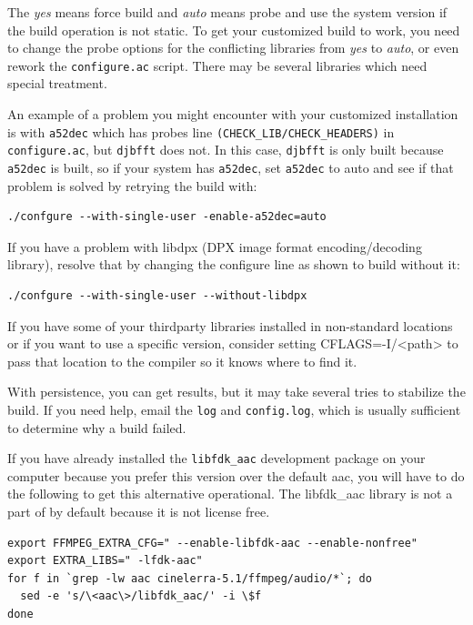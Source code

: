 The \textit{yes} means force build and \textit{auto} means probe and
use the system version if the build operation is not static.  To get
your customized build to work, you need to change the probe options
for the conflicting libraries from \textit{yes} to \textit{auto}, or
even rework the \texttt{configure.ac} script.  There may be several
libraries which need special treatment.

An example of a problem you might encounter with your customized
installation is with \texttt{a52dec} which has probes line
\texttt{(CHECK\_LIB/CHECK\_HEADERS)} in \texttt{configure.ac}, but
\texttt{djbfft} does not.  In this case, \texttt{djbfft} is only
built because \texttt{a52dec} is built, so if your system has
\texttt{a52dec}, set \texttt{a52dec} to auto and see if that
problem is solved by retrying the build with:
\begin{lstlisting}[style=sh]
./confgure --with-single-user -enable-a52dec=auto
\end{lstlisting}
If you have a problem with libdpx (DPX image format encoding/decoding library), resolve that by changing the configure line as shown to build without it: 
\begin{lstlisting}[style=sh]
./confgure --with-single-user --without-libdpx
\end{lstlisting}

If you have some of your thirdparty libraries installed in non-standard
locations or if you want to use a specific version, consider setting CFLAGS=-I/<path> to pass that location to the compiler so it knows where to find it.

With persistence, you can get results, but it may take several tries
to stabilize the build.  If you need help, email the \texttt{log}
and \texttt{config.log}, which is usually sufficient to determine
why a build failed.

If you have already installed the \texttt{libfdk\_aac} development
package on your computer because you prefer this version over the
default aac, you will have to do the following to get this
alternative operational. The libfdk\_aac library is not a part of
\CGG{} by default because it is not license free.

\begin{lstlisting}[style=sh]
export FFMPEG_EXTRA_CFG=" --enable-libfdk-aac --enable-nonfree"
export EXTRA_LIBS=" -lfdk-aac"
for f in `grep -lw aac cinelerra-5.1/ffmpeg/audio/*`; do
  sed -e 's/\<aac\>/libfdk_aac/' -i \$f
done
\end{lstlisting}


